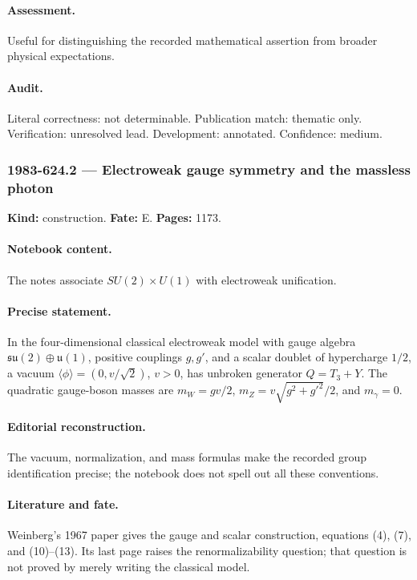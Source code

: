 \paragraph{Assessment.} Useful for distinguishing the recorded mathematical assertion from broader physical expectations.

\paragraph{Audit.} Literal correctness: not determinable. Publication match: thematic only. Verification: unresolved lead. Development: annotated. Confidence: medium.

\subsubsection{1983-624.2 --- Electroweak gauge symmetry and the massless photon}

\label{item:1983-624.2}

\noindent\textbf{Kind:} construction. \textbf{Fate:} E. \textbf{Pages:} 1173.\par

\paragraph{Notebook content.} The notes associate \(SU(2)\times U(1)\) with electroweak unification.

\paragraph{Precise statement.} In the four-dimensional classical electroweak model with gauge algebra \(\mathfrak{su}(2)\oplus\mathfrak u(1)\), positive couplings \(g,g'\), and a scalar doublet of hypercharge \(1/2\), a vacuum \(\langle\phi\rangle=(0,v/\sqrt2)\), \(v>0\), has unbroken generator \(Q=T_3+Y\). The quadratic gauge-boson masses are \(m_W=gv/2\), \(m_Z=v\sqrt{g^2+g'^2}/2\), and \(m_\gamma=0\).

\paragraph{Editorial reconstruction.} The vacuum, normalization, and mass formulas make the recorded group identification precise; the notebook does not spell out all these conventions.

\paragraph{Literature and fate.} Weinberg’s 1967 paper gives the gauge and scalar construction, equations (4), (7), and (10)–(13). Its last page raises the renormalizability question; that question is not proved by merely writing the classical model.

